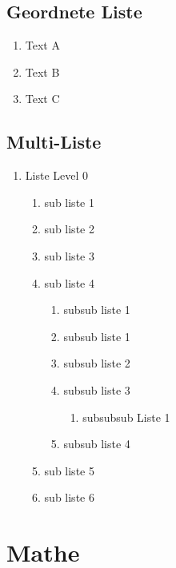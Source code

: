 \documentclass{scrreprt}
\begin{document}
		\section{Geordnete Liste}
		\label{se:geordneteli}

			\begin{enumerate}
				\item Text A
				\item Text B
				\item Text C
			\end{enumerate}


		\section{Multi-Liste}
		\label{se:multili}
	
			\begin{enumerate}    
				\item Liste Level 0
		
					\begin{enumerate}
						\item sub liste 1
						\item sub liste 2
						\item sub liste 3
						\item sub liste 4
			
					\begin{enumerate}
						\item subsub liste 1
						\item subsub liste 1
			 			\item subsub liste 2
			 			\item subsub liste 3
			 			\begin{enumerate}
							\item  subsubsub Liste 1	 			
		 				\end{enumerate}
			 			\item subsub liste 4				
					\end{enumerate}
						\item sub liste 5
						\item sub liste 6
			
					\end{enumerate}
		
			\end{enumerate}

	\chapter{Mathe}
	\label{cha:mathe}
\end{document}
